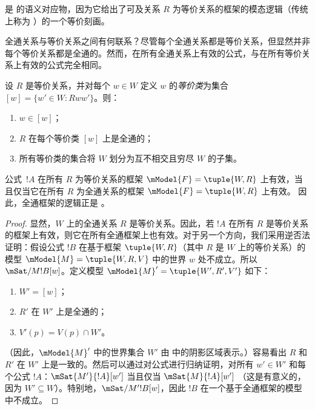 \documentclass[../../../include/open-logic-section]{subfiles}
\begin{document}
 是  的语义对应物，因为它给出了可及关系 $R$ 为等价关系的框架的模态逻辑（传统上称为 ）的一个等价刻画。

全通关系与等价关系之间有何联系？尽管每个全通关系都是等价关系，但显然并非每个等价关系都是全通的。然而，在所有全通关系上有效的公式，与在所有等价关系上有效的公式完全相同。

\begin{prop}
  设 $R$ 是等价关系，并对每个 $w \in W$ 定义 $w$ 的\emph{等价类}为集合 $[w] = \{w'\in W :
  Rww'\}$。则：
  \begin{enumerate}
  \item $w \in [w]$；
  \item $R$ 在每个等价类 $[w]$ 上是全通的；
  \item 所有等价类的集合将 $W$ 划分为互不相交且穷尽 $W$ 的子集。
  \end{enumerate}
\end{prop}

\begin{prop}
  公式~$!A$ 在所有 $R$ 为等价关系的框架 $\mModel{F} =\tuple{W,R}$ 上有效，当且仅当它在所有 $R$ 为全通关系的框架 $\mModel{F} =\tuple{W,R}$ 上有效。
  因此，全通框架的逻辑正是 。
\end{prop}

\begin{proof}
  显然，$W$ 上的全通关系 $R$ 是等价关系。因此，若 $!A$ 在所有 $R$ 是等价关系的框架上有效，则它在所有全通框架上也有效。对于另一个方向，我们采用逆否法证明：假设公式 $!B$ 在基于框架 $\tuple{W,R}$（其中 $R$ 是 $W$ 上的等价关系）的模型 $\mModel{M} = \tuple{W, R, V}$ 中的世界 $w$ 处不成立。所以 $\mSat/{M}{!B}[w]$。定义模型 $\mModel{M}' = \tuple{W',
    R', V'}$ 如下：
  \begin{enumerate}
  \item $W' = [w]$；
  \item $R'$ 在 $W'$ 上是全通的；
  \item $V'(p) = V(p) \cap W'$。
  \end{enumerate}
  （因此，$\mModel{M}'$ 中的世界集合 $W'$ 由  中的阴影区域表示。）容易看出 $R$ 和 $R'$ 在 $W'$ 上是一致的。然后可以通过对公式进行归纳证明，对所有 $w' \in W'$ 和每个公式 $!A$：$\mSat{M'}{!A}[w']$ 当且仅当 $\mSat{M}{!A}[w']$ （这是有意义的，因为 $W' \subseteq W$）。特别地，$\mSat/{M'}{!B}[w]$，因此 $!B$ 在一个基于全通框架的模型中不成立。
\end{proof}
\end{document}
